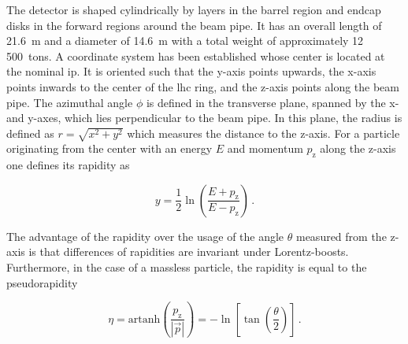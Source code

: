 
The detector is shaped cylindrically by layers in the barrel region and endcap disks in the forward regions around the beam pipe. It has an overall length of 21.6~m and a diameter of 14.6~m with a total weight of approximately 12\,500~tons. A coordinate system has been established whose center is located at the nominal \gls{ip}. It is oriented such that the y-axis points upwards, the x-axis points inwards to the center of the \gls{lhc} ring, and the z-axis points along the beam pipe. The azimuthal angle $\phi$ is defined in the transverse plane, spanned by the x- and y-axes, which lies perpendicular to the beam pipe. In this plane, the radius is defined as $r=\sqrt{x^2+y^2}$ which measures the distance to the z-axis. For a particle originating from the center with an energy $E$ and momentum $p_\mathrm{z}$ along the z-axis one defines its rapidity as

\begin{equation}
y=\frac{1}{2}\ln\left(\frac{E+p_\mathrm{z}}{E-p_\mathrm{z}}\right)\,. \label{eq:experiment-rapidity}
\end{equation}

The advantage of the rapidity over the usage of the angle $\theta$ measured from the z-axis is that differences of rapidities are invariant under Lorentz-boosts. Furthermore, in the case of a massless particle, the rapidity is equal to the pseudorapidity

\begin{equation}
\eta=\mathrm{artanh}\left(\frac{p_\mathrm{z}}{|\vec{p}|}\right)=-\ln\left[\tan\left(\frac{\theta}{2}\right)\right]\,. \label{eq:experiment-pseudorapidity}
\end{equation}

